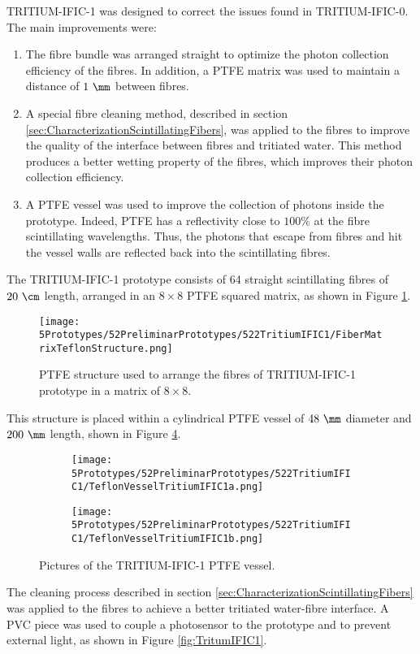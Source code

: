 TRITIUM-IFIC-1 was designed to correct the issues found in TRITIUM-IFIC-0. The main improvements were:

\begin{enumerate}

\item{} The fibre bundle was arranged straight to optimize the photon collection efficiency of the fibres. In addition, a PTFE matrix was used to maintain a distance of $1~\mm$ between fibres.

\item{} A special fibre cleaning method, described in section \ref{sec:CharacterizationScintillatingFibers}, was applied to the fibres to improve the quality of the interface between fibres and tritiated water. This method produces a better wetting property of the fibres, which improves their photon collection efficiency.

\item{} A PTFE vessel was used to improve the collection of photons inside the prototype. Indeed, PTFE has a reflectivity close to $100\%$ at the fibre scintillating wavelengths. Thus, the photons that escape from fibres and hit the vessel walls are reflected back into the scintillating fibres.

\end{enumerate}

The TRITIUM-IFIC-1 prototype consists of 64 straight scintillating fibres of $20~\cm$ length, arranged in an $8\times 8$ PTFE squared matrix, as shown in Figure \ref{fig:TeflonStructureFibersTritiumIFIC1}.
\begin{figure}[h]
\centering
\texttt{[image: 5Prototypes/52PreliminarPrototypes/522TritiumIFIC1/FiberMatrixTeflonStructure.png]}
\caption{PTFE structure used to arrange the fibres of TRITIUM-IFIC-1 prototype in a matrix of $8 \times 8$.\label{fig:TeflonStructureFibersTritiumIFIC1}}
\end{figure}
This structure is placed within a cylindrical PTFE vessel of $48~\mm$ diameter and $200~\mm$ length, shown in Figure \ref{fig:TeflonVesselTritumIFIC1}. 
\begin{figure}
\centering
    \begin{subfigure}[b]{0.30\textwidth}
    \centering
    \texttt{[image: 5Prototypes/52PreliminarPrototypes/522TritiumIFIC1/TeflonVesselTritiumIFIC1a.png]}  
    \caption{\label{subfig:TeflonVesselTritumIFIC1a}}
    \end{subfigure}
    \hfill
    \begin{subfigure}[b]{0.45\textwidth}
    \centering
    \texttt{[image: 5Prototypes/52PreliminarPrototypes/522TritiumIFIC1/TeflonVesselTritiumIFIC1b.png]}  
    \caption{\label{subfig:TeflonVesselTritumIFIC1b}}
    \end{subfigure}
 \caption{Pictures of the TRITIUM-IFIC-1 PTFE vessel.}
 \label{fig:TeflonVesselTritumIFIC1}
\end{figure}
The cleaning process described in section \ref{sec:CharacterizationScintillatingFibers} was applied to the fibres to achieve a better tritiated water-fibre interface. A PVC piece was used to couple a photosensor to the prototype and to prevent external light, as shown in Figure \ref{fig:TritumIFIC1}.

